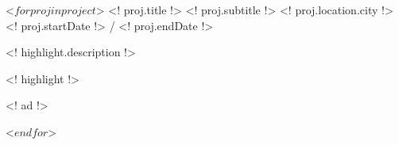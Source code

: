 \begin{cventries}
 <$ for proj in project $>
  \cventry
    {<! proj.title !>}
    {<! proj.subtitle !>}
    {<! proj.location.city !>}
    {<! proj.startDate !> / <! proj.endDate !>}
    {
          \begin{cvitems}
                    \item{<! highlight.description !>}
                    \item{<! highlight !>}
                    \begin{cvitemssub}
                        \item{<! ad !>}
                    \end{cvitemssub}
          \end{cvitems}
    }
 <$ endfor $>
\end{cventries}

